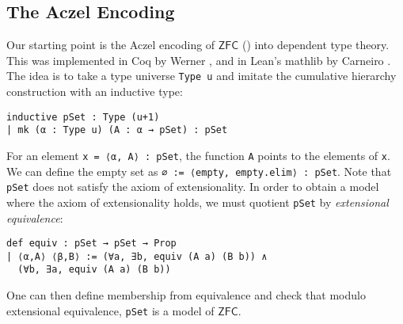 \documentclass[sigplan,screen]{acmart}
\newcommand{\lil}{\lstinline}
\newcommand{\ZFC}{\mathsf{ZFC}}
\theoremstyle{definition}
\begin{document}
\subsection{The Aczel Encoding}
\label{subsect:bset:aczel}
Our starting point is the Aczel encoding of \(\ZFC\) (\cite{aczel1978type, aczel1986type, aczel1982type}) into dependent type theory.
This was implemented in Coq by Werner \cite{werner1997sets}, and in Lean's \textsf{mathlib} by Carneiro \cite{mario1}.
The idea is to take a type universe \lstinline{Type u} and imitate the cumulative hierarchy construction with an inductive type:
\begin{lstlisting}
inductive pSet : Type (u+1)
| mk (α : Type u) (A : α → pSet) : pSet
\end{lstlisting}
For an element \lil{x = ⟨α, A⟩ : pSet}, the function \lil{A} points to the elements of \lil{x}.
We can define the empty set as \lstinline{∅ := ⟨empty, empty.elim⟩ : pSet}.
Note that \lil{pSet} does not satisfy the axiom of extensionality.
In order to obtain a model where the axiom of extensionality holds, we must quotient \lstinline{pSet} by \emph{extensional equivalence}:%
\begin{lstlisting}
def equiv : pSet → pSet → Prop
| ⟨α,A⟩ ⟨β,B⟩ := (∀a, ∃b, equiv (A a) (B b)) ∧
  (∀b, ∃a, equiv (A a) (B b))
\end{lstlisting}
One can then define membership from equivalence and check that modulo extensional equivalence, \lstinline{pSet} is a model of \(\ZFC\).

\end{document}

